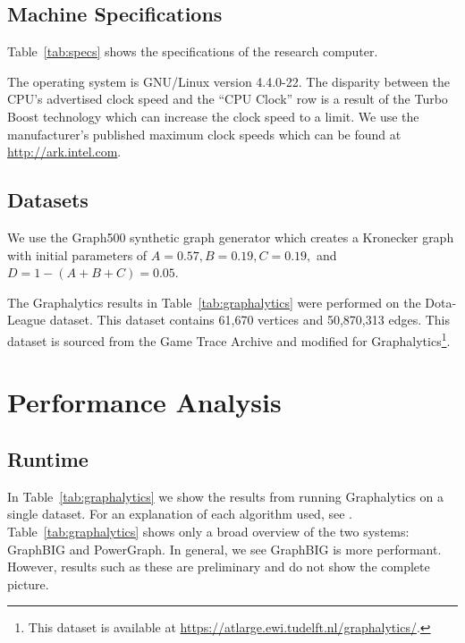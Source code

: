\documentclass{llncs}
\begin{document}
\subsection{Machine Specifications}
Table~\ref{tab:specs} shows the specifications of the research computer.

\begin{table}
	\centering
	\caption{The operating system is GNU/Linux version 4.4.0-22. The disparity between the CPU's advertised clock speed and the ``CPU Clock'' row is a result of the Turbo Boost technology which can increase the clock speed to a limit. We use the manufacturer's published maximum clock speeds which can be found at \url{http://ark.intel.com}.}
	\label{tab:specs}
\end{table}

\subsection{Datasets}
We use the Graph500 synthetic graph generator which creates a Kronecker graph \cite{Leskovec:2010:Kronecker} with initial parameters of $A = 0.57, B = 0.19, C = 0.19,$ and $D = 1-(A+B+C) = 0.05$.

The Graphalytics results in Table~\ref{tab:graphalytics} were performed on the Dota-League dataset. This dataset contains 61,670 vertices and 50,870,313 edges. This dataset is sourced from the Game Trace Archive\cite{Guo:2012:GTA} and modified for Graphalytics\footnote{This dataset is available at \url{https://atlarge.ewi.tudelft.nl/graphalytics/}.}.

\section{Performance Analysis}

\subsection{Runtime}

In Table~\ref{tab:graphalytics} we show the results from running Graphalytics on a single dataset. For an explanation of each algorithm used, see \cite{Iosup:2016:Graphalyticstech}. Table~\ref{tab:graphalytics} shows only a broad overview of the two systems: GraphBIG and PowerGraph. In general, we see GraphBIG is more performant. However, results such as these are preliminary and do not show the complete picture.
\end{document}
